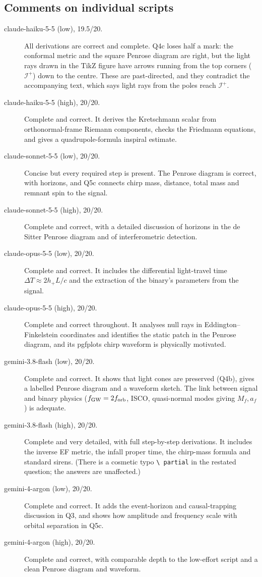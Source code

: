 \documentclass[11pt]{article}
\begin{document}
\subsection*{Comments on individual scripts}
\begin{description}
\item[claude-haiku-5-5 (low), 19.5/20.] All derivations are correct and complete. Q4c loses half a mark: the conformal metric and
the square Penrose diagram are right, but the light rays drawn in the TikZ figure have arrows running from the top corners
($\mathcal{I}^+$) down to the centre. These are past-directed, and they contradict the accompanying text, which says light rays
from the poles reach $\mathcal{I}^+$.
\item[claude-haiku-5-5 (high), 20/20.] Complete and correct. It derives the Kretschmann scalar from orthonormal-frame Riemann components,
checks the Friedmann equations, and gives a quadrupole-formula inspiral estimate.
\item[claude-sonnet-5-5 (low), 20/20.] Concise but every required step is present. The Penrose diagram is correct, with horizons, and Q5c connects chirp mass, distance,
total mass and remnant spin to the signal.
\item[claude-sonnet-5-5 (high), 20/20.] Complete and correct, with a detailed discussion of horizons in the de Sitter Penrose diagram and of
interferometric detection.
\item[claude-opus-5-5 (low), 20/20.] Complete and correct. It includes the differential light-travel time $\Delta T \approx 2h_+L/c$ and the
extraction of the binary's parameters from the signal.
\item[claude-opus-5-5 (high), 20/20.] Complete and correct throughout. It analyses null rays in Eddington--Finkelstein coordinates and identifies
the static patch in the Penrose diagram, and its pgfplots chirp waveform is physically motivated.
\item[gemini-3.8-flash (low), 20/20.] Complete and correct. It shows that light cones are preserved (Q4b), gives a labelled Penrose diagram and
a waveform sketch. The link between signal and binary physics ($f_{\rm GW}=2f_{\rm orb}$, ISCO, quasi-normal modes giving $M_f, a_f$)
is adequate.
\item[gemini-3.8-flash (high), 20/20.] Complete and very detailed, with full step-by-step derivations. It includes the inverse EF metric, the infall
proper time, the chirp-mass formula and standard sirens. (There is a cosmetic typo \verb|\ partial| in the restated question; the answers are unaffected.)
\item[gemini-4-argon (low), 20/20.] Complete and correct. It adds the event-horizon and causal-trapping discussion in Q3, and shows how amplitude and frequency
scale with orbital separation in Q5c.
\item[gemini-4-argon (high), 20/20.] Complete and correct, with comparable depth to the low-effort script and a clean Penrose diagram and waveform.
\end{description}
\end{document}
